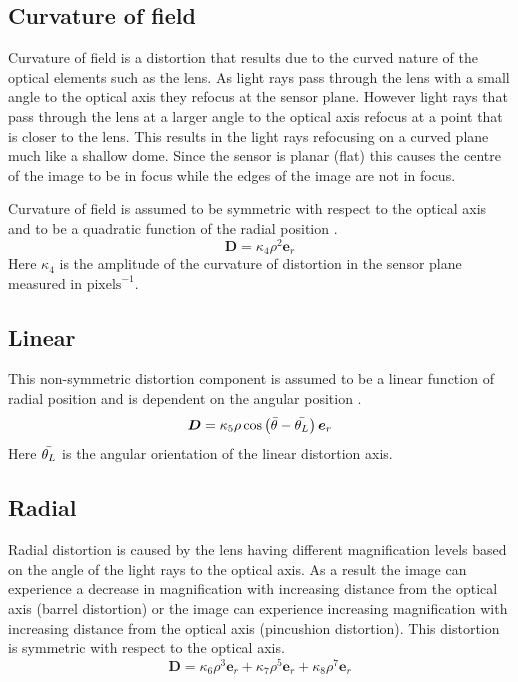 \documentclass[[12pt,oneside,openany,a4paper, %
\newcommand*\mean[1]{\bar{#1}} %
\begin{document}
\subsection{Curvature of field}
Curvature of field is a distortion that results due to the curved nature of the optical elements such as the lens. As light rays pass through the lens with a small angle to the optical axis they refocus at the sensor plane. However light rays that pass through the lens at a larger angle to the optical axis refocus at a point that is closer to the lens. This results in the light rays refocusing on a curved plane much like a shallow dome. Since the sensor is planar (flat) this causes the centre of the image to be in focus while the edges of the image are not in focus.

Curvature of field is assumed to be symmetric with respect to the optical axis and to be a quadratic function of the radial position \cite{sutton2009image}.
\begin{equation}
  \bm{D}=\kappa_4 \rho^2 \bm{e}_r
\end{equation}
Here $\kappa_4$ is the amplitude of the curvature of distortion in the sensor plane measured in $\text{pixels}^{-1}$.

\subsection{Linear}
This non-symmetric distortion component is assumed to be a linear function of radial position and is dependent on the angular position \cite{sutton2009image}.
\begin{equation}
  \bm{D} = \kappa_5 \rho \cos \left( \mean{\theta} - \mean{\theta_L} \right) \bm{e}_r
\end{equation}
Here $\mean{\theta_L}$ is the angular orientation of the linear distortion axis.

\subsection{Radial}
Radial distortion is caused by the lens having different magnification levels based on the angle of the light rays to the optical axis. As a result the image can experience a decrease in magnification with increasing distance from the optical axis (barrel distortion) or the image can experience increasing magnification with increasing distance from the optical axis (pincushion distortion). This distortion is symmetric with respect to the optical axis.
\begin{equation}
  \bm{D} = \kappa_6 \rho ^3 \bm{e}_r + \kappa_7 \rho^5 \bm{e}_r + \kappa_8 \rho^7 \bm{e}_r
\end{equation}
\end{document}
